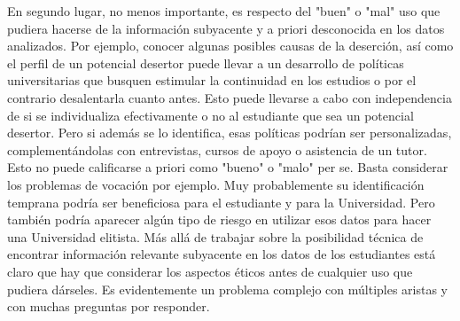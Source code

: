 

En segundo lugar, no menos importante, es respecto del "buen" o "mal" uso que
pudiera hacerse de la información subyacente y a priori desconocida en los datos
analizados. Por ejemplo, conocer algunas posibles causas de la deserción, así como
el perfil de un potencial desertor puede llevar a un desarrollo de políticas universitarias
que busquen estimular la continuidad en los estudios o por el contrario desalentarla
cuanto antes. Esto puede llevarse a cabo con independencia de si se individualiza
efectivamente o no al estudiante que sea un potencial desertor. Pero si además se lo
identifica, esas políticas podrían ser personalizadas, complementándolas con
entrevistas, cursos de apoyo o asistencia de un tutor. Esto no puede calificarse a priori
como "bueno" o "malo" per se. Basta considerar los problemas de vocación por
ejemplo. Muy probablemente su identificación temprana podría ser beneficiosa para el
estudiante y para la Universidad. Pero también podría aparecer algún tipo de riesgo en
utilizar esos datos para hacer una Universidad elitista.
Más allá de trabajar sobre la posibilidad técnica de encontrar información relevante
subyacente en los datos de los estudiantes está claro que hay que considerar los
aspectos éticos antes de cualquier uso que pudiera dárseles. Es evidentemente un
problema complejo con múltiples aristas y con muchas preguntas por responder.

